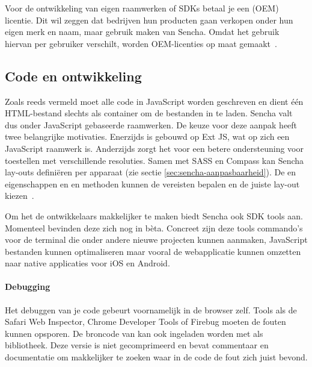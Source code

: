 Voor de ontwikkeling van eigen raamwerken of SDKs betaal je een  (OEM) licentie.  
Dit wil zeggen dat bedrijven hun producten gaan verkopen onder hun eigen merk en naam, maar gebruik maken van Sencha.  
Omdat het gebruik hiervan per gebruiker verschilt,  worden OEM-licenties op maat gemaakt~\cite{Inc.}.

\subsection{Code en ontwikkeling}
Zoals reeds vermeld moet alle code in JavaScript worden geschreven en dient één HTML-bestand slechts als container om de bestanden in te laden.  
Sencha valt dus onder JavaScript gebaseerde raamwerken.  
De keuze voor deze aanpak heeft twee belangrijke motivaties.  
Enerzijds is \st{} gebouwd op Ext JS,  wat op zich een JavaScript raamwerk is.  
Anderzijds zorgt het voor een betere ondersteuning voor toestellen met verschillende resoluties.  
Samen met SASS en Compass kan Sencha lay-outs definiëren per apparaat (zie sectie \ref{sec:sencha-aanpasbaarheid}).  
De  en  eigenschappen en  en  methoden kunnen de vereisten bepalen en de juiste lay-out kiezen~\cite{JohnEClark2012}.

Om het de ontwikkelaars makkelijker te maken biedt Sencha ook SDK tools aan.  
Momenteel bevinden deze zich nog in bèta.  
Concreet zijn deze tools commando's voor de terminal die onder andere nieuwe projecten kunnen aanmaken, JavaScript bestanden kunnen optimaliseren maar vooral de webapplicatie kunnen omzetten naar native applicaties voor iOS en Android.

\paragraph{Debugging}
Het debuggen van je code gebeurt voornamelijk in de browser zelf.  
Tools als de Safari Web Inspector,  Chrome Developer Tools of Firebug moeten de fouten kunnen opsporen.  
De broncode van \st{} kan ook ingeladen worden met  als bibliotheek.  
Deze versie is niet gecomprimeerd en bevat commentaar en documentatie om makkelijker te zoeken waar in de code de fout zich juist bevond.

